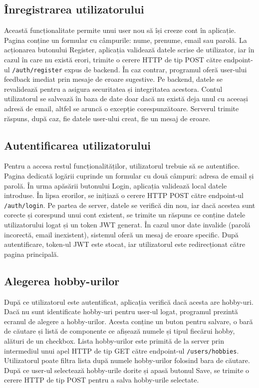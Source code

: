 \subsection{Înregistrarea utilizatorului}
\label{subsec:ch4sec2sub1}
Această funcționalitate permite unui user nou să își creeze cont în aplicație. Pagina conține un formular cu câmpurile: nume, prenume, email sau parolă.
La acționarea butonului Register, aplicația validează datele scrise de utilizator, iar în cazul în care
nu există erori, trimite o cerere HTTP de tip POST către endpoint-ul \texttt{/auth/register} expus de backend. În caz contrar, programul oferă user-ului feedback imediat prin mesaje de eroare sugestive.
Pe backend, datele se revalidează pentru a asigura securitatea și integritatea acestora. 
Contul utilizatorul se salvează în baza de date doar dacă nu există deja unul cu aceeași adresă de email, altfel se aruncă o excepție corespunzătoare.
Serverul trimite răspuns, după caz, fie datele user-ului creat, fie un mesaj de eroare.

\subsection{Autentificarea utilizatorului}
\label{subsec:ch4sec2sub2}
Pentru a accesa restul funcționalităților, utilizatorul trebuie să se autentifice. Pagina dedicată logării cuprinde un formular cu două câmpuri: adresa de email și parolă.
În urma apăsării butonului Login, aplicația validează local datele introduse. În lipsa erorilor, se inițiază o cerere HTTP POST către endpoint-ul \texttt{/auth/login}.
Pe partea de server, datele se verifică din nou, iar dacă acestea sunt corecte și corespund unui cont existent, se trimite un răspuns ce conține datele utilizatorului logat și un token JWT generat.
În cazul unor date invalide (parolă incorectă, email inexistent), sistemul oferă un mesaj de eroare specific. După autentificare, token-ul JWT este stocat, iar utilizatorul este redirecționat către pagina principală.


\subsection{Alegerea hobby-urilor}
\label{subsec:ch4sec2sub3}
După ce utilizatorul este autentificat, aplicația verifică dacă acesta are hobby-uri. Dacă nu sunt identificate hobby-uri pentru user-ul logat, programul prezintă
ecranul de alegere a hobby-urilor. Acesta conține un buton pentru salvare, o bară de căutare și listă de componente ce afișează numele și tipul fiecărui hobby, alături de un checkbox.
Lista hobby-urilor este primită de la server prin intermediul unui apel HTTP de tip GET către endpoint-ul \texttt{/users/hobbies}. 
Utilizatorul poate filtra lista după numele hobby-urilor folosind bara de căutare. 
După ce user-ul selectează hobby-urile dorite și apasă butonul Save, se trimite o cerere HTTP de tip POST pentru a salva hobby-urile selectate.

